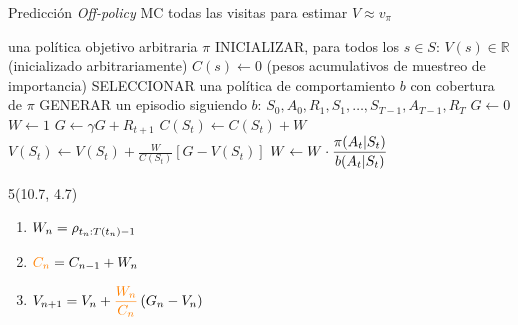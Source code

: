 \documentclass[10pt, envcountsect, handout, aspectratio=1610, hyperref={hypertexnames=true}]{beamer}
\begin{document}
\begin{frame}{Predicción  \textit{Off-policy} MC todas las visitas para estimar $V \approx v_\pi$}

\begin{algorithm}[H]
	\caption{Predicción fuera de política MC para estimar \(V\approx v_\pi\)}
	\label{alg:off_policy_mc}
	\begin{algorithmic} 	\small
		\REQUIRE una política objetivo arbitraria \(\pi\)
		\STATE INICIALIZAR, para todos los \(s \in S\):
		\STATE \hspace{1em} \(V(s) \in \mathbb{R}\) (inicializado arbitrariamente)
		\STATE \hspace{1em} \(C(s) \gets 0\) (pesos acumulativos de muestreo de importancia)
		\STATE SELECCIONAR una política de comportamiento \(b\) con cobertura de \(\pi\)
		\STATE GENERAR un episodio siguiendo \(b\): \(S_0, A_0, R_1, S_1, \dots, S_{T-1}, A_{T-1}, R_T\)
		\STATE \(G \gets 0\) 
		\STATE \(W \gets 1\) 
		\STATE \(G \gets \gamma G + R_{t+1}\) \qquad \qquad \qquad \quad  {}
		\STATE \(C(S_t) \gets C(S_t) + W\) \qquad \qquad \qquad  {}
		\STATE \(V(S_t) \gets V(S_t) + \frac{W}{C(S_t)} [G - V(S_t)]\) 
		\STATE \(\displaystyle W \gets W \cdot \frac{\pi(A_t|S_t)}{b(A_t|S_t)}\) \qquad \qquad \qquad {}
		\ENDFOR
		\ENDWHILE
	\end{algorithmic}
\end{algorithm}

\TPMargin{0mm}%
\begin{textblock}{5}(10.7, 4.7) 
	\begin{tcolorbox}[colback=red!2!white]
	 \hspace*{-0.5cm}\parbox{5cm}{	
	 	\begin{enumerate}
			\item \(W_{n} = {\large\rho}_{t_{n}:T(t_{n})-1}\) 
			\item ${\color{orange} C_{n}} = C_{n-1} + W_{n}$
			\item $\displaystyle V_{n+1}=V_n + {\color{orange} \frac{W_{n}}{C_{n}} } \left(  G_{n} - V_n \right )$
		\end{enumerate}}
	\end{tcolorbox}
\end{textblock}

\end{frame}
\end{document}
